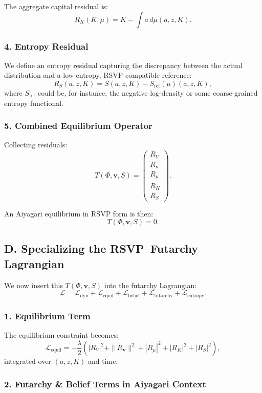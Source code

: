 \documentclass[12pt]{article}
\begin{document}
The aggregate capital residual is:
\[
R_K(K,\mu)
=
K - \int a\, d\mu(a,z,K).
\]

\subsubsection*{4. Entropy Residual}

We define an entropy residual capturing the discrepancy between the
actual distribution and a low-entropy, RSVP-compatible reference:
\[
R_S(a,z,K)
=
S(a,z,K) - S_{\text{ref}}(\mu)(a,z,K),
\]
where $S_{\text{ref}}$ could be, for instance, the negative log-density
or some coarse-grained entropy functional.

\subsubsection*{5. Combined Equilibrium Operator}

Collecting residuals:
\[
T(\Phi,\mathbf{v},S)
=
\begin{pmatrix}
R_V \\
R_{\mathbf{v}} \\
R_\mu \\
R_K \\
R_S
\end{pmatrix}.
\]

An Aiyagari equilibrium in RSVP form is then:
\[
T(\Phi,\mathbf{v},S) = 0.
\]

\subsection*{D. Specializing the RSVP--Futarchy Lagrangian}

We now insert this $T(\Phi,\mathbf{v},S)$ into the futarchy Lagrangian:
\[
\mathcal{L}
=
\mathcal{L}_{\text{dyn}}
+
\mathcal{L}_{\text{equil}}
+
\mathcal{L}_{\text{belief}}
+
\mathcal{L}_{\text{futarchy}}
+
\mathcal{L}_{\text{entropy}}.
\]

\subsubsection*{1. Equilibrium Term}

The equilibrium constraint becomes:
\[
\mathcal{L}_{\text{equil}}
=
- \frac{\lambda}{2}
\left(
    |R_V|^2
  + \|R_{\mathbf{v}}\|^2
  + |R_\mu|^2
  + |R_K|^2
  + |R_S|^2
\right),
\]
integrated over $(a,z,K)$ and time.

\subsubsection*{2. Futarchy \& Belief Terms in Aiyagari Context}
\end{document}
